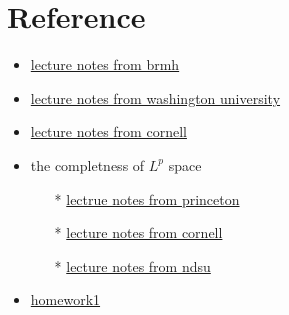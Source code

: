 \section{Reference}
\begin{itemize}
    \item \href{https://web.mat.bham.ac.uk/~malevao/MSM3P21/l10.pdf}{lecture notes from brmh}
    \item \href{https://sites.math.washington.edu/~burke/crs/555/555_notes/hilbert.pdf}{lecture notes from washington university}
    \item \href{https://e.math.cornell.edu/people/belk/measuretheory/BanachSpaces.pdf}{lecture notes from cornell}
    \item the completness of $L^p$ space
    \begin{itemize}
        \item[*] \href{https://assets.press.princeton.edu/chapters/s9627.pdf}{lectrue notes from princeton}
        \item[*] \href{https://e.math.cornell.edu/people/belk/measuretheory/LpFunctions.pdf}{lecture notes from cornell}
        \item[*] \href{https://www.ndsu.edu/pubweb/~littmann/Topics15/class8-28.pdf}{lecture notes from ndsu} 
    \end{itemize}
    \item \href{https://math.stackexchange.com/questions/3886899/prove-that-l2i-is-a-hilbert-space}{homework1}
\end{itemize}